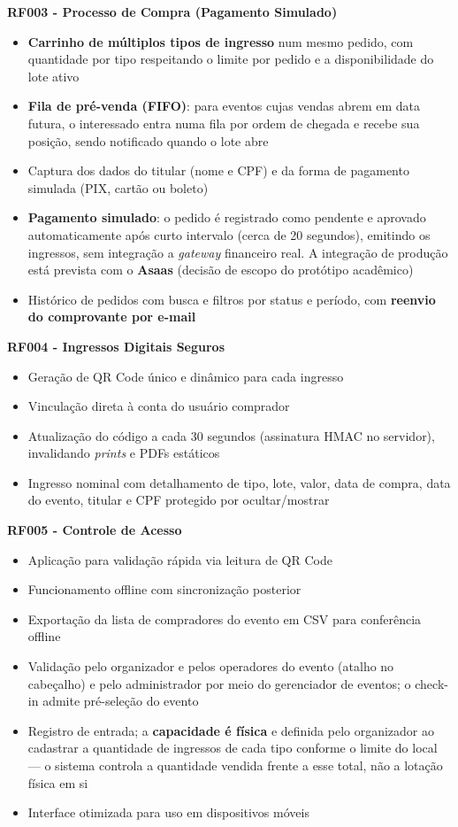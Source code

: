 \textbf{RF003 - Processo de Compra (Pagamento Simulado)}
\begin{itemize}
    \item \textbf{Carrinho de múltiplos tipos de ingresso} num mesmo pedido, com quantidade por tipo respeitando o limite por pedido e a disponibilidade do lote ativo
    \item \textbf{Fila de pré-venda (FIFO)}: para eventos cujas vendas abrem em data futura, o interessado entra numa fila por ordem de chegada e recebe sua posição, sendo notificado quando o lote abre
    \item Captura dos dados do titular (nome e CPF) e da forma de pagamento simulada (PIX, cartão ou boleto)
    \item \textbf{Pagamento simulado}: o pedido é registrado como pendente e aprovado automaticamente após curto intervalo (cerca de 20 segundos), emitindo os ingressos, sem integração a \textit{gateway} financeiro real. A integração de produção está prevista com o \textbf{Asaas} (decisão de escopo do protótipo acadêmico)
    \item Histórico de pedidos com busca e filtros por status e período, com \textbf{reenvio do comprovante por e-mail}
\end{itemize}

\textbf{RF004 - Ingressos Digitais Seguros}
\begin{itemize}
    \item Geração de QR Code único e dinâmico para cada ingresso
    \item Vinculação direta à conta do usuário comprador
    \item Atualização do código a cada 30 segundos (assinatura HMAC no servidor), invalidando \textit{prints} e PDFs estáticos
    \item Ingresso nominal com detalhamento de tipo, lote, valor, data de compra, data do evento, titular e CPF protegido por ocultar/mostrar
\end{itemize}

\textbf{RF005 - Controle de Acesso}
\begin{itemize}
    \item Aplicação para validação rápida via leitura de QR Code
    \item Funcionamento offline com sincronização posterior
    \item Exportação da lista de compradores do evento em CSV para conferência offline
    \item Validação pelo organizador e pelos operadores do evento (atalho no cabeçalho) e pelo administrador por meio do gerenciador de eventos; o check-in admite pré-seleção do evento
    \item Registro de entrada; a \textbf{capacidade é física} e definida pelo organizador ao cadastrar a quantidade de ingressos de cada tipo conforme o limite do local — o sistema controla a quantidade vendida frente a esse total, não a lotação física em si
    \item Interface otimizada para uso em dispositivos móveis
\end{itemize}

